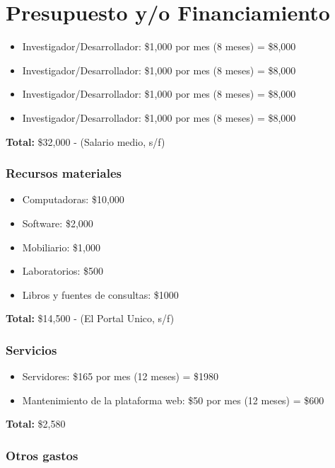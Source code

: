 \documentclass{article}
\begin{document}
\section{Presupuesto y/o Financiamiento}
\begin{itemize}
  \item Investigador/Desarrollador: \$1,000 por mes (8 meses) = \$8,000
  \item Investigador/Desarrollador: \$1,000 por mes (8 meses) = \$8,000
  \item Investigador/Desarrollador: \$1,000 por mes (8 meses) = \$8,000
  \item Investigador/Desarrollador: \$1,000 por mes (8 meses) = \$8,000
\end{itemize} 

\textbf{Total:} \$32,000
\cite{Talent} - (Salario medio, s/f)

\subsubsection{Recursos materiales}

\begin{itemize}
  \item Computadoras: \$10,000
  \item Software: \$2,000
  \item Mobiliario: \$1,000
  \item Laboratorios: \$500
  \item Libros y fuentes de consultas: \$1000
\end{itemize}

\textbf{Total:} \$14,500
\cite{Portal} - (El Portal Unico, s/f)

\subsubsection{Servicios}

\begin{itemize}
  \item Servidores: \$165 por mes (12 meses) = \$1980
  \item Mantenimiento de la plataforma web: \$50 por mes (12 meses) = \$600
\end{itemize}

\textbf{Total:} \$2,580

\subsubsection{Otros gastos}
\end{document}
